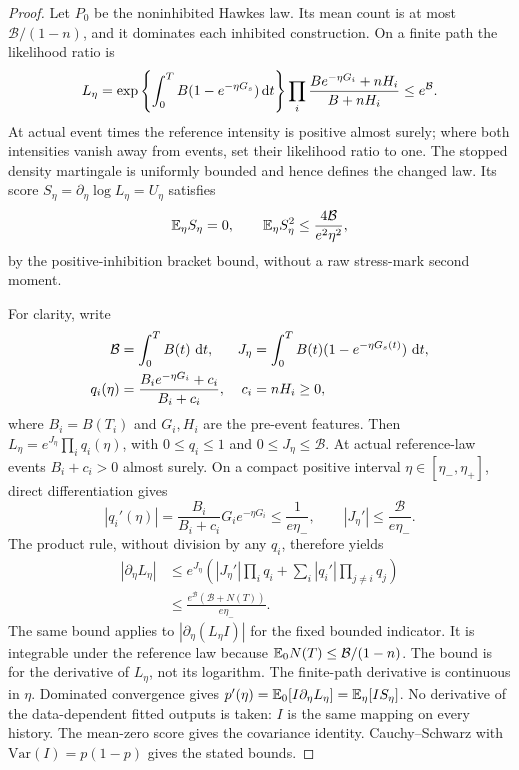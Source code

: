 \begin{proof}
Let \(P_0\) be the noninhibited Hawkes law. Its mean count is at most \(\mathcal B/(1-n)\), and it dominates each inhibited construction. On a finite path the likelihood ratio is
\[
L_\eta=\exp\left\{\int_0^TB(1-e^{-\eta G_s})\mathop{}\!\mathrm{d} t\right\}
\prod_i\frac{Be^{-\eta G_i}+nH_i}{B+nH_i}\le e^{\mathcal B}.
\]
At actual event times the reference intensity is positive almost surely; where both intensities vanish away from events, set their likelihood ratio to one. The stopped density martingale is uniformly bounded and hence defines the changed law. Its score \(S_\eta=\partial_\eta\log L_\eta=U_\eta\) satisfies
\[
\mathbb{E} _\eta S_\eta=0,\qquad
\mathbb{E} _\eta S_\eta^2\le\frac{4\mathcal B}{e^2\eta^2},
\]
by the positive-inhibition bracket bound, without a raw stress-mark second moment.

For clarity, write
\[
\begin{aligned}
 \mathcal B&=\int_0^T B(t)\,\mathop{}\!\mathrm{d} t,
 &J_\eta&=\int_0^T B(t)(1-e^{-\eta G_s(t)})\,\mathop{}\!\mathrm{d} t,\\
 q_i(\eta)&=\frac{B_i e^{-\eta G_i}+c_i}{B_i+c_i},
 &c_i&=nH_i\geq0,
\end{aligned}
\]
where $B_i=B(T_i)$ and $G_i,H_i$ are the pre-event features. Then
$L_\eta=e^{J_\eta}\prod_iq_i(\eta)$, with $0\leq q_i\leq1$ and
$0\leq J_\eta\leq\mathcal B$. At actual reference-law events
$B_i+c_i>0$ almost surely. On a compact positive interval
$\eta\in[\eta_-,\eta_+]$, direct differentiation gives
\[
 |q_i'(\eta)|
 =\frac{B_i}{B_i+c_i}G_i e^{-\eta G_i}
 \leq\frac{1}{e\eta_-},
 \qquad
 |J_\eta'|\leq\frac{\mathcal B}{e\eta_-}.
\]
The product rule, without division by any $q_i$, therefore yields
\[
\begin{aligned}
 |\partial_\eta L_\eta|
 &\leq e^{J_\eta}\left(
 |J_\eta'|\prod_iq_i+
 \sum_i |q_i'|\prod_{j\ne i}q_j\right)\\
 &\leq\frac{e^{\mathcal B}(\mathcal B+N(T))}{e\eta_-}.
\end{aligned}
\]
The same bound applies to $|\partial_\eta(L_\eta I)|$ for the fixed bounded
indicator. It is integrable under the reference law because
$\mathbb{E} _0N(T)\leq\mathcal B/(1-n)$. The bound is for the derivative of
$L_\eta$, not its logarithm. The finite-path derivative is continuous in $\eta$. Dominated convergence gives
\(p'(\eta)=\mathbb{E} _0[I\partial_\eta L_\eta]=\mathbb{E} _\eta[IS_\eta]\).
No derivative of the data-dependent fitted outputs is taken: \(I\) is the same mapping on every history. The mean-zero score gives the covariance identity. Cauchy--Schwarz with \(\mathrm{Var}(I)=p(1-p)\) gives the stated bounds.
\end{proof}

